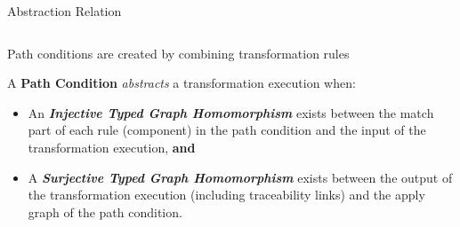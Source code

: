 \documentclass[final,hyperref={pdfpagelabels=false}]{beamer}
\begin{document}
\begin{frame}{}
\begin{columns}[t]
\begin{column}{.993\linewidth}
\begin{block}{Abstraction Relation}
\begin{columns}[t]
\begin{column}{.24\linewidth}
\begin{center}
             \footnotesize{Path conditions are created by combining transformation rules~\cite{LuVa2013a}}\vspace{1cm}
                                  
             
              \end{center}            
              \small{
              A \textbf{Path Condition} \emph{abstracts} a transformation execution when:}
              \vspace{.2cm}
              \begin{itemize}
                \item \small{An \textbf{\emph{Injective Typed Graph Homomorphism}} exists between the match part of each rule (component) in the path condition and the input of the transformation execution, \textbf{and}}\vspace{.5cm}
                \item \small{A \textbf{\emph{Surjective Typed Graph Homomorphism}} exists between the output of the transformation execution (including traceability links) and the apply graph of the path condition.}
              \end{itemize}
                           

\end{column}
\end{columns}
\end{block}
\end{column}
\end{columns}
\end{frame}
\end{document}
